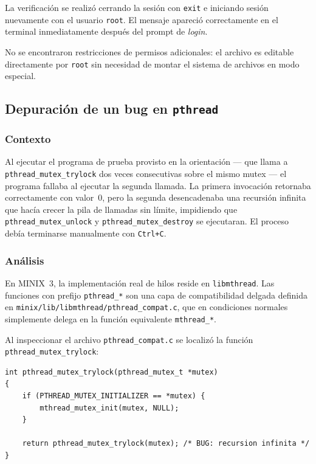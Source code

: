 \documentclass[11pt,a4paper]{article}
\begin{document}
La verificaci\'on se realiz\'o cerrando la sesi\'on con \texttt{exit} e iniciando sesi\'on nuevamente con el usuario \texttt{root}. El mensaje apareci\'o correctamente en el terminal inmediatamente despu\'es del prompt de \emph{login}.

No se encontraron restricciones de permisos adicionales: el archivo es editable directamente por \texttt{root} sin necesidad de montar el sistema de archivos en modo especial.

\subsection{Depuraci\'on de un bug en \texttt{pthread}}

\subsubsection*{Contexto}

Al ejecutar el programa de prueba provisto en la orientaci\'on --- que llama a \texttt{pthread\_mutex\_trylock} dos veces consecutivas sobre el mismo mutex --- el programa fallaba al ejecutar la segunda llamada. La primera invocaci\'on retornaba correctamente con valor~0, pero la segunda desencadenaba una recursi\'on infinita que hac\'ia crecer la pila de llamadas sin l\'imite, impidiendo que \texttt{pthread\_mutex\_unlock} y \texttt{pthread\_mutex\_destroy} se ejecutaran. El proceso deb\'ia terminarse manualmente con \texttt{Ctrl+C}.

\subsubsection*{An\'alisis}

En MINIX~3, la implementaci\'on real de hilos reside en \texttt{libmthread}. Las funciones con prefijo \texttt{pthread\_*} son una capa de compatibilidad delgada definida en \texttt{minix/lib/libmthread/pthread\_compat.c}, que en condiciones normales simplemente delega en la funci\'on equivalente \texttt{mthread\_*}.

Al inspeccionar el archivo \texttt{pthread\_compat.c} se localiz\'o la funci\'on \texttt{pthread\_mutex\_trylock}:

\begin{lstlisting}[style=cstyle,caption={C\'odigo err\'oneo original --- llamada recursiva a s\'i misma}]
int pthread_mutex_trylock(pthread_mutex_t *mutex)
{
    if (PTHREAD_MUTEX_INITIALIZER == *mutex) {
        mthread_mutex_init(mutex, NULL);
    }

    return pthread_mutex_trylock(mutex); /* BUG: recursion infinita */
}
\end{lstlisting}
\end{document}
